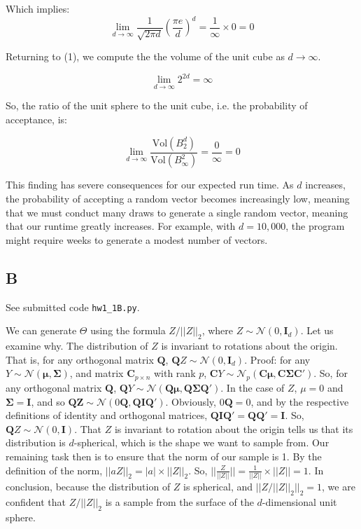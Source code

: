 \documentclass{report}
\begin{document}
Which implies:
\begin{equation}
\lim_{d \to \infty} \frac{1}{\sqrt{2\pi d}} \left( \frac{\pi e}{d} \right)^d =
	\frac{1}{\infty} \times 0 = 0
\end{equation}

Returning to (1), we compute the the volume of the unit cube as $d \to \infty$.

\begin{equation}
\lim_{d \to \infty} 2^{2d} = \infty
\end{equation}

So, the ratio of the unit sphere to the unit cube, i.e. the probability of
acceptance, is:

\begin{equation}
\lim_{d \to \infty} \frac{\mathrm{Vol}(B^d_2)}{\mathrm{Vol}(B^2_\infty)} =
\frac{0}{\infty} = 0
\end{equation}

This finding has severe consequences for our expected run time. As $d$
increases, the probability of accepting a random vector becomes increasingly
low, meaning that we must conduct many draws to generate a single random vector,
meaning that our runtime greatly increases. For example, with $d=10,000$, the
program might require weeks to generate a modest number of vectors.

\subsection*{B}
See submitted code \texttt{hw1\_1B.py}.

We can generate $\Theta$ using the
formula $Z / ||Z||_2$, where $Z \sim \mathcal{N}(0,
\mathbf{I}_d)$. Let us examine why. The distribution of
$Z$ is invariant to rotations about the origin. That is, for any orthogonal matrix
$\mathbf{Q}$, $\mathbf{Q}Z \sim \mathcal{N}(0, \mathbf{I}_d)$. Proof: for any
$Y \sim \mathcal{N}(\mathbf{\mu}, \mathbf{\Sigma})$, and  matrix $\mathbf{C}_{p
\times n}$ with rank $p$, $\mathbf{C}Y \sim \mathcal{N}_p (\mathbf{C\mu}, \mathbf{C\Sigma
C'})$. So, for any orthogonal matrix $\mathbf{Q}$, $\mathbf{Q}Y \sim
\mathcal{N}(\mathbf{Q\mu}, \mathbf{Q\Sigma Q'})$. In the case of $Z$,
$\mu = 0$ and $\mathbf{\Sigma} = \mathbf{I}$, and so $\mathbf{QZ} \sim
\mathcal{N}(0\mathbf{Q}, \mathbf{QIQ'})$. Obviously, $0\mathbf{Q}=0$, and by the
respective definitions of identity and orthogonal matrices,
$\mathbf{QIQ}'=\mathbf{QQ}'=\mathbf{I}$. So, $\mathbf{Q}Z \sim \mathcal{N}(0,
\mathbf{I})$. That $Z$ is invariant to rotation about the origin tells
us that its distribution is $d$-spherical, which is the shape we want to sample
from. Our remaining task then is to ensure that the norm of our sample is 1. By the
definition of the norm, $||aZ||_2 = |a|\times||Z||_2$. So, $||\frac{Z}{||Z||}||
= \frac{1}{||Z||} \times ||Z|| = 1$. In conclusion, because the distribution of
$Z$ is spherical, and $||Z / ||Z||_2||_2 = 1$, we are
confident that $Z / ||Z||_2$ is a sample from the surface of the $d$-dimensional
unit sphere.
\end{document}
